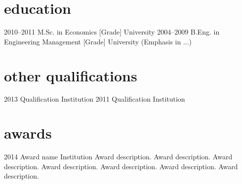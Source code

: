 \documentclass[]{cv-style}          %
\begin{document}

\section{education}

\begin{entrylist}
  \entry
  {2010--2011}
  {M.Sc. {\normalfont in Economics [Grade]}}
  {University}
  {\vspace{-0.3cm}}
  \entry
  {2004--2009}
  {B.Eng. {\normalfont in Engineering Management [Grade]}}
  {University}
  {(Emphasis in ...)}
\end{entrylist}


\section{other qualifications}

\begin{entrylist}
  \entry
  {2013}
  {Qualification}
  {Institution}
  {\vspace{-0.3cm}}
  \entry
  {2011}
  {Qualification}
  {Institution}
  {\vspace{-0.3cm}}
\end{entrylist}


\section{awards}

\begin{entrylist}
  \entry
  {2014}
  {Award name}
  {Institution}
  {Award description. Award description. Award description. Award description. Award description. Award description. Award description. }
\end{entrylist}
\end{document}
